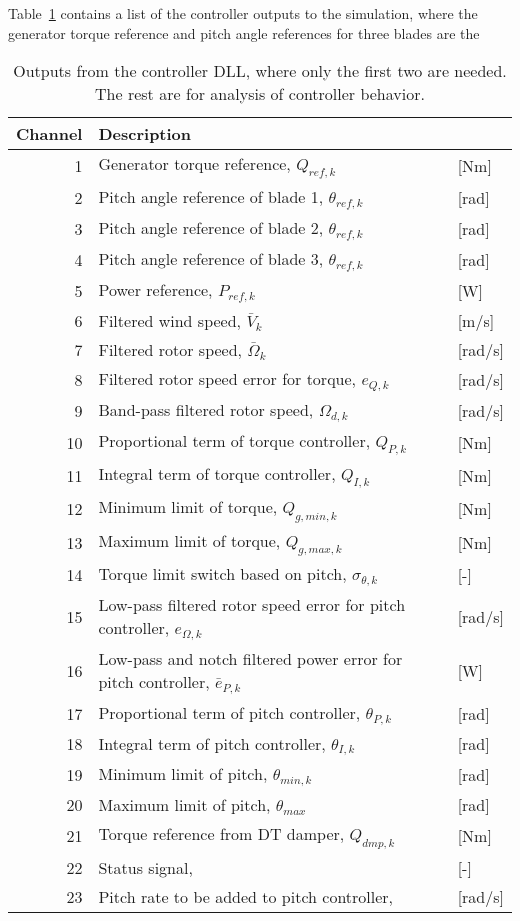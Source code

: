 Table~\ref{t:output} contains a list of the controller outputs to the simulation, where the generator torque reference and pitch angle references for three blades are the

\begin{table}[t]
\center
\begin{tabular}{r|ll}
Channel & Description \\ \hline
 1& Generator torque reference, $Q_{ref,k}$            &[Nm]\\
 2& Pitch angle reference of blade 1, $\theta_{ref,k}$      &[rad]\\
 3& Pitch angle reference of blade 2, $\theta_{ref,k}$      &[rad]\\
 4& Pitch angle reference of blade 3, $\theta_{ref,k}$      &[rad]\\
 5& Power reference, $P_{ref,k}$                       &[W]\\
 6& Filtered wind speed, $\bar V_k$                   &[m/s]\\
 7& Filtered rotor speed, $\bar \Omega_k$                  &[rad/s]\\
 8& Filtered rotor speed error for torque, $e_{Q,k}$ &[rad/s]\\
 9& Band-pass filtered rotor speed, $\Omega_{d,k}$         &[rad/s]\\
10& Proportional term of torque controller, $Q_{P,k}$    &[Nm]\\
11& Integral term of torque controller, $Q_{I,k}$    &[Nm]\\
12& Minimum limit of torque, $Q_{g,min,k}$               &[Nm]\\
13& Maximum limit of torque, $Q_{g,max,k}$               &[Nm]\\
14& Torque limit switch based on pitch, $\sigma_{\theta,k}$    &[-]\\
15& Low-pass filtered rotor speed error for pitch controller, $e_{\Omega,k}$  &[rad/s]\\
16& Low-pass and notch filtered power error for pitch controller, $\bar e_{P,k}$                 &[W]\\
17& Proportional term of pitch controller, $\theta_{P,k}$ &[rad]\\
18& Integral term of pitch controller, $\theta_{I,k}$     &[rad]\\
19& Minimum limit of pitch, $\theta_{min,k}$                &[rad]\\
20& Maximum limit of pitch, $\theta_{max}$                &[rad]\\
21& Torque reference from DT damper, $Q_{dmp,k}$       &[Nm] \\
22& Status signal,        &[-] \\
23& Pitch rate to be added to pitch controller,        &[rad/s]
\end{tabular}
\caption{Outputs from the controller DLL, where only the first two are needed. The rest are for analysis of controller behavior.  \label{t:output}}
\end{table}

